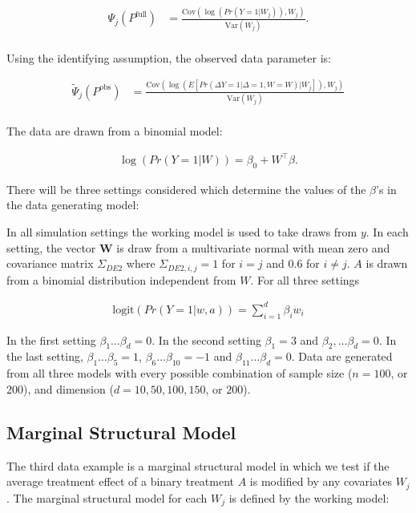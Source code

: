 \documentclass{article}
\begin{document}
\begin{align*}
	\Psi_{j}\left(P^{\text{full}}\right) &= \frac{\text{Cov}\left(\log\left(Pr \left(Y = 1 |  W_j\right)\right), W_j\right)}{\text{Var}(W_j)}.\\
\end{align*}

Using the identifying assumption, the observed data parameter is:

\begin{align*}
	\tilde{\Psi}_{j}\left(P^{\text{obs}}\right)&= \frac{\text{Cov}\left(\log\left(E\left[Pr \left(\Delta  Y = 1 | \Delta = 1, W = W\right) |  W_j\right]\right), W_j\right)}{\text{Var}(W_j)}\\
\end{align*}

The data are drawn from a binomial model:

\begin{align*}
    \log(Pr(Y = 1 | W)) = \beta_0 + W^\top \beta.
\end{align*}

There will be three settings considered which determine  the values of the $\beta$'s in the data generating model:

In all simulation settings the working model is used to take draws from $y$. In each setting, the vector $\boldsymbol{W}$ is draw from a multivariate normal with mean zero and covariance matrix $\Sigma_{DE2}$ where $\Sigma_{DE2, i, j} = 1$ for $i = j$ and $0.6$ for $i \neq j$.  $A$ is drawn from a binomial distribution independent from $W$.  For all three settings 

\begin{align*}
	\text{logit}\left(Pr(Y = 1 | w, a)\right) = \sum_{i = 1}^{d} \beta_{i} w_i
\end{align*}

In the first setting $\beta_1 \dots \beta_d = 0$.  In the second setting $\beta_1 = 3$ and $\beta_2, \dots \beta_d = 0$.  In the last setting, $\beta_1 \dots \beta_5 = 1$, $\beta_6 \dots \beta_{10} = -1$ and $\beta_{11} \dots \beta_d = 0$.  Data are generated from all three models with every possible combination of sample size ($n = 100$, or $200$), and dimension ($d = 10, 50, 100, 150$, or $200$).

\subsection{Marginal Structural Model}
The third data example is a marginal structural model in which we test if the average treatment effect of a binary treatment $A$ is modified by any covariates $W_j$.  The marginal structural model for each $W_j$ is defined by the working model:
\end{document}

